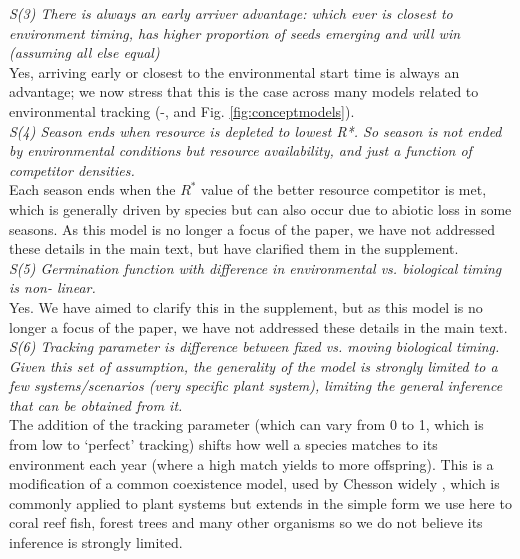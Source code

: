 \documentclass[11pt]{article}
\begin{document}
\emph{S(3)     There is always an early arriver advantage: which ever is closest to environment
timing, has higher proportion of seeds emerging and will win (assuming all else equal)}\\

Yes, arriving early or closest to the environmental start time is always an advantage; we now stress that this is the case across many models related to environmental tracking (-, and Fig. \ref{fig:conceptmodels}).\\

\emph{S(4)     Season ends when resource is depleted to lowest R*. So season is not ended by
environmental conditions but resource availability, and just a function of competitor
densities.}\\

Each season ends when the $R^*$ value of the better resource competitor is met, which is generally driven by species but can also occur due to abiotic loss in some seasons. As this model is no longer a focus of the paper, we have not addressed these details in the main text, but have clarified them in the supplement.\\

\emph{S(5)     Germination function with difference in environmental vs. biological timing is non-
linear.}\\

Yes. We have aimed to clarify this in the supplement, but as this model is no longer a focus of the paper, we have not addressed these details in the main text.\\

\emph{S(6)     Tracking parameter is difference between fixed vs. moving biological timing.
Given this set of assumption, the generality of the model is strongly limited to a few
systems/scenarios (very specific plant system), limiting the general inference that can be
obtained from it.}\\

The addition of the tracking parameter (which can vary from 0 to 1, which is from low to `perfect' tracking) shifts how well a species matches to its environment each year (where a high match yields to more offspring). This is a modification of a common coexistence model, used by Chesson widely \citep[][]{Chesson:2000vd,Chesson:2004eo}, which is commonly applied to plant systems but extends in the simple form we use here to coral reef fish, forest trees and many other organisms \citep[see][]{Chesson:1997dz} so we do not believe its inference is strongly limited.
\end{document}
